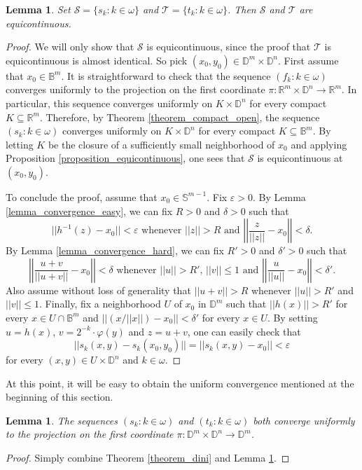 \documentclass{amsart}
\theoremstyle{plain}
\newtheorem{lemma}[theorem]{Lemma}
\theoremstyle{definition}
\newcommand{\Ss}{\mathcal{S}}
\newcommand{\TT}{\mathcal{T}}
\newcommand{\BBB}{\mathbb{B}}
\newcommand{\DDD}{\mathbb{D}}
\newcommand{\RRR}{\mathbb{R}}
\newcommand{\SSS}{\mathbb{S}}
\begin{document}
\begin{lemma}\label{lemma_equicontinuous}
Set $\Ss=\{s_k:k\in\omega\}$ and $\TT=\{t_k:k\in\omega\}$. Then $\Ss$ and $\TT$ are equicontinuous.
\end{lemma}
\begin{proof}
We will only show that $\Ss$ is equicontinuous, since the proof that $\TT$ is equicontinuous is almost identical. So pick $(x_0,y_0)\in\DDD^m\times\DDD^n$. First assume that $x_0\in\BBB^m$. It is straightforward to check that the sequence $(f_k:k\in\omega)$ converges uniformly to the projection on the first coordinate $\pi:\RRR^m\times\DDD^n\longrightarrow\RRR^m$. In particular, this sequence converges uniformly on $K\times\DDD^n$ for every compact $K\subseteq\RRR^m$. Therefore, by Theorem \ref{theorem_compact_open}, the sequence $(s_k:k\in\omega)$ converges uniformly on $K\times\DDD^n$ for every compact $K\subseteq\BBB^m$. By letting $K$ be the closure of a sufficiently small neighborhood of $x_0$ and applying Proposition \ref{proposition_equicontinuous}, one sees that $\Ss$ is equicontinuous at $(x_0,y_0)$.

To conclude the proof, assume that $x_0\in\SSS^{m-1}$. Fix $\varepsilon>0$. By Lemma \ref{lemma_convergence_easy}, we can fix $R>0$ and $\delta>0$ such that
$$
||h^{-1}(z)-x_0||<\varepsilon\text{ whenever }||z||>R\text{ and }\left|\left|\frac{z}{||z||}-x_0\right|\right|<\delta.
$$
By Lemma \ref{lemma_convergence_hard}, we can fix $R'>0$ and $\delta'>0$ such that
$$
\left|\left|\frac{u+v}{||u+v||}-x_0\right|\right|<\delta\text{ whenever }||u||>R'\text{, }||v||\leq 1\text{ and }\left|\left|\frac{u}{||u||}-x_0\right|\right|<\delta'.
$$
Also assume without loss of generality that $||u+v||>R$ whenever $||u||>R'$ and $||v||\leq 1$. Finally, fix a neighborhood $U$ of $x_0$ in $\DDD^m$ such that $||h(x)||>R'$ for every $x\in U\cap\BBB^m$ and $||(x/||x||)-x_0||<\delta'$ for every $x\in U$. By setting $u=h(x)$, $v=2^{-k}\cdot\varphi(y)$ and $z=u+v$, one can easily check that 
$$
||s_k(x,y)-s_k(x_0,y_0)||=||s_k(x,y)-x_0||<\varepsilon
$$
for every $(x,y)\in U\times\DDD^n$ and $k\in\omega$.
\end{proof}

At this point, it will be easy to obtain the uniform convergence mentioned at the beginning of this section.

\begin{lemma}\label{lemma_equicontinuity}
The sequences $(s_k:k\in\omega)$ and $(t_k:k\in\omega)$ both converge uniformly to the projection on the first coordinate $\pi:\DDD^m\times\DDD^n\longrightarrow\DDD^m$.
\end{lemma}
\begin{proof}
Simply combine Theorem \ref{theorem_dini} and Lemma \ref{lemma_equicontinuous}.
\end{proof}
\end{document}
